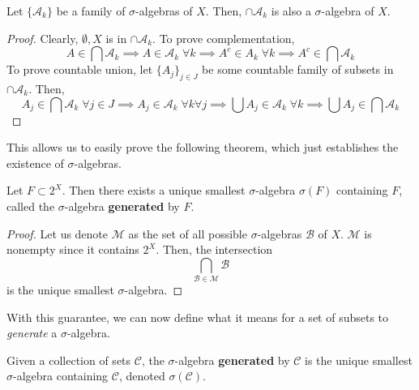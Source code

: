   \begin{theorem}
    Let $\{\mathcal{A}_k\}$ be a family of $\sigma$-algebras of $X$. Then, $\cap \mathcal{A}_k$ is also a $\sigma$-algebra of $X$. 
  \end{theorem}
  \begin{proof}
    Clearly, $\emptyset, X$ is in $\cap \mathcal{A}_k$. To prove complementation, 
    \begin{equation}
      A \in \bigcap \mathcal{A}_k \implies A \in \mathcal{A}_k \; \forall k \implies A^c \in A_k \; \forall k \implies A^c \in \bigcap \mathcal{A}_k
    \end{equation}
    To prove countable union, let $\{A_j\}_{j \in J}$ be some countable family of subsets in $\cap \mathcal{A}_k$. Then, 
    \begin{equation}
      A_j \in \bigcap \mathcal{A}_k \; \forall j \in J \implies A_j \in \mathcal{A}_k \; \forall k \forall j \implies \bigcup A_j \in \mathcal{A}_k \; \forall k \implies \bigcup A_j \in \bigcap \mathcal{A}_k
    \end{equation}
  \end{proof}

  This allows us to easily prove the following theorem, which just establishes the existence of $\sigma$-algebras. 

  \begin{theorem}
    Let $F \subset 2^X$. Then there exists a unique smallest $\sigma$-algebra $\sigma(F)$ containing $F$, called the $\sigma$-algebra \textbf{generated} by $F$. 
  \end{theorem}
  \begin{proof}
    Let us denote $\mathcal{M}$ as the set of all possible $\sigma$-algebras $\mathcal{B}$ of $X$. $\mathcal{M}$ is nonempty since it contains $2^X$. Then, the intersection 
    \begin{equation}
      \bigcap_{\mathcal{B} \in \mathcal{M}} \mathcal{B}
    \end{equation}
    is the unique smallest $\sigma$-algebra. 
  \end{proof} 

  With this guarantee, we can now define what it means for a set of subsets to \textit{generate} a $\sigma$-algebra. 

  \begin{definition}
    Given a collection of sets $\mathscr{C}$, the $\sigma$-algebra \textbf{generated} by $\mathscr{C}$ is the unique smallest $\sigma$-algebra containing $\mathscr{C}$, denoted $\sigma(\mathscr{C})$. 
  \end{definition} 

